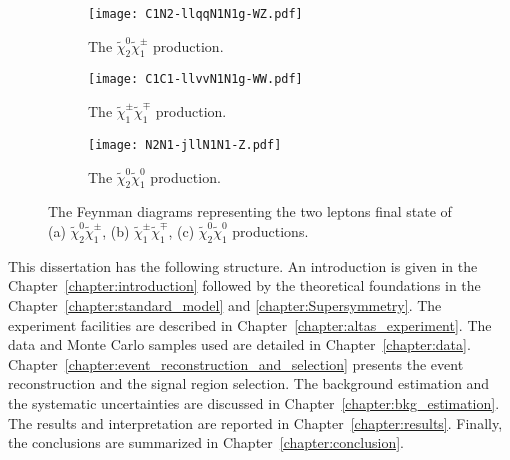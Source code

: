 \begin{figure}[htbp]
    \begin{center}
        \begin{subfigure}[b]{0.32\textwidth}
            \begin{center}
                \texttt{[image: C1N2-llqqN1N1g-WZ.pdf]}
                \caption{The $\widetilde{\chi}^{0}_{2} \widetilde{\chi}^{\pm}_{1}$ production.}
            \end{center}
        \end{subfigure}%
        \begin{subfigure}[b]{0.32\textwidth}
            \begin{center}
                \texttt{[image: C1C1-llvvN1N1g-WW.pdf]}
                \caption{The $\widetilde{\chi}^{\pm}_{1} \widetilde{\chi}^{\mp}_{1}$ production.}
            \end{center}
        \end{subfigure}
        \begin{subfigure}[b]{0.32\textwidth}
            \begin{center}
                \texttt{[image: N2N1-jllN1N1-Z.pdf]}
                \caption{The $\widetilde{\chi}^{0}_{2} \widetilde{\chi}^{0}_{1}$ production.}
            \end{center}
        \end{subfigure}
    \end{center}
    \caption{The Feynman diagrams representing the two leptons final state of (a) $\widetilde{\chi}^{0}_{2} \widetilde{\chi}^{\pm}_{1}$, (b) $\widetilde{\chi}^{\pm}_{1} \widetilde{\chi}^{\mp}_{1}$, (c) $\widetilde{\chi}^{0}_{2} \widetilde{\chi}^{0}_{1}$ productions.}
    \label{fig:intro_feynman_diagrams}
\end{figure}

This dissertation has the following structure.
An introduction is given in the Chapter~\ref{chapter:introduction} followed by the theoretical foundations in the Chapter~\ref{chapter:standard_model} and \ref{chapter:Supersymmetry}.
The experiment facilities are described in Chapter~\ref{chapter:altas_experiment}.
The data and Monte Carlo samples used are detailed in Chapter~\ref{chapter:data}.
Chapter~\ref{chapter:event_reconstruction_and_selection} presents the event reconstruction and the signal region selection.
The background estimation and the systematic uncertainties are discussed in Chapter~\ref{chapter:bkg_estimation}.
The results and interpretation are reported in Chapter~\ref{chapter:results}.
Finally, the conclusions are summarized in Chapter~\ref{chapter:conclusion}.
